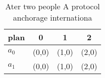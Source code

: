 \documentclass[a4paper]{article}
\begin{document}
\begin{table}
\begin{adjustbox}{width=0.6\columnwidth}
\begin{tabular}{|l|l|l|l|}
\hline
\textbf{plan} & \multicolumn{1}{c|}{\textbf{0}} & \multicolumn{1}{c|}{\textbf{1}} & \multicolumn{1}{c|}{\textbf{2}} \\ \hline
\textbf{$a_0$}  & (0,0) & (1,0) & (2,0) \\ \hline
\textbf{$a_1$}  & (0,0) & (1,0) & (2,0) \\ \hline
\end{tabular}
\end{adjustbox}
\caption{Ater two people A protocol anchorage internationa
}
\end{table}
\end{document}
